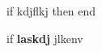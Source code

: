 if kdjflkj then  end

\texttt{}
if
\textbf{laskdj}
\textbf{}jlkenv
\begin{equation}
				\texttt{}
\end{equation}
